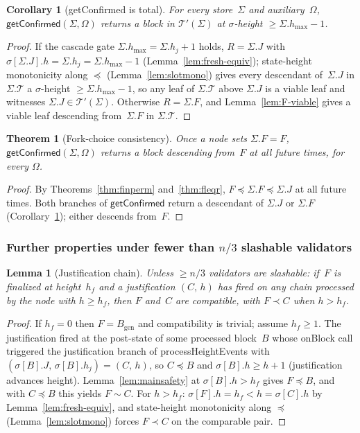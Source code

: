 \ifx\litemode\undefined\documentclass{article}\fi
\newcommand{\genesis}{\ensuremath{B_{\mathrm{gen}}}}
\newcommand{\T}[0]{\ensuremath{\mathcal{T}}}
\newcommand{\hmax}{\ensuremath{h_{\max}}\xspace}
\newcommand{\viableTree}{\ensuremath{\mathcal{T}'}}
\newcommand{\processHeightEvents}{\textsf{processHeightEvents}\xspace}
\newcommand{\onBlock}{\textsf{onBlock}\xspace}
\newcommand{\getConfirmed}{\textsf{getConfirmed}\xspace}
\theoremstyle{plain}
\newtheorem{theorem}{Theorem}
\newtheorem{corollary}{Corollary}
\newtheorem{lemma}{Lemma}
\theoremstyle{definition}
\theoremstyle{remark}
\begin{document}
\begin{corollary}[\getConfirmed is total]\label{cor:getConfirmed-total}
For every store~$\Sigma$ and auxiliary~$\Omega$, $\getConfirmed(\Sigma, \Omega)$ returns a block in $\viableTree(\Sigma)$ at $\sigma$-height $\geq \Sigma.\hmax - 1$.
\end{corollary}

\begin{proof}
If the cascade gate $\Sigma.\hmax = \Sigma.h_j + 1$ holds, $R = \Sigma.J$ with $\sigma[\Sigma.J].h = \Sigma.h_j = \Sigma.\hmax - 1$ (Lemma~\ref{lem:fresh-equiv}); state-height monotonicity along $\preceq$ (Lemma~\ref{lem:slotmono}) gives every descendant of~$\Sigma.J$ in $\Sigma.\T$ a $\sigma$-height $\geq \Sigma.\hmax - 1$, so any leaf of $\Sigma.\T$ above $\Sigma.J$ is a viable leaf and witnesses $\Sigma.J \in \viableTree(\Sigma)$.
Otherwise $R = \Sigma.F$, and Lemma~\ref{lem:F-viable} gives a viable leaf descending from~$\Sigma.F$ in $\Sigma.\T$.
\end{proof}

\begin{theorem}[Fork-choice consistency]\label{thm:fcconsistency}
Once a node sets $\Sigma.F = F$, $\getConfirmed(\Sigma, \Omega)$ returns a block descending from~$F$ at all future times, for every $\Omega$.
\end{theorem}

\begin{proof}
By Theorems~\ref{thm:finperm} and~\ref{thm:fleqr}, $F \preceq \Sigma.F \preceq \Sigma.J$ at all future times.
Both branches of $\getConfirmed$ return a descendant of $\Sigma.J$ or $\Sigma.F$ (Corollary~\ref{cor:getConfirmed-total}); either descends from~$F$.
\end{proof}

\subsubsection*{Further properties under fewer than $n/3$ slashable validators}

\begin{lemma}[Justification chain]\label{lem:certchain}
Unless $\geq n/3$ validators are slashable: if~$F$ is finalized at height~$h_f$ and a justification $(C,\, h)$ has fired on any chain processed by the node with $h \geq h_f$, then $F$ and~$C$ are compatible, with $F \prec C$ when $h > h_f$.
\end{lemma}

\begin{proof}
If $h_f = 0$ then $F = \genesis$ and compatibility is trivial; assume $h_f \geq 1$.
The justification fired at the post-state of some processed block~$B$ whose \onBlock call triggered the justification branch of \processHeightEvents with $(\sigma[B].J,\, \sigma[B].h_j) = (C,\, h)$, so $C \preceq B$ and $\sigma[B].h \geq h + 1$ (justification advances height).
Lemma~\ref{lem:mainsafety} at $\sigma[B].h > h_f$ gives $F \preceq B$, and with $C \preceq B$ this yields $F \sim C$.
For $h > h_f$: $\sigma[F].h = h_f < h = \sigma[C].h$ by Lemma~\ref{lem:fresh-equiv}, and state-height monotonicity along $\preceq$ (Lemma~\ref{lem:slotmono}) forces $F \prec C$ on the comparable pair.
\end{proof}
\end{document}
